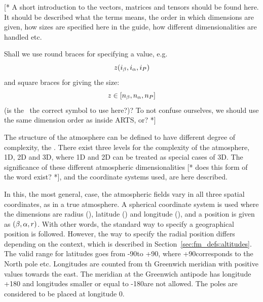 \label{sec:fm_defs:math}

[* A short introduction to the vectors, matrices and tensors should be
found here. It should be described what the terms means, the order in
which dimensions are given, how sizes are specified here in the guide,
how different dimensionalities are handled etc. 

Shall we use round braces for specifying a value, e.g.
\begin{equation}
  z(i_{\beta},i_{\alpha},i_{P})
\end{equation}
and square braces for giving the size:
\begin{equation}
  z \in [n_{\beta},n_{\alpha},n_{P}]
\end{equation}
(is the \SzeSmb\ the correct symbol to use here?)? To not confuse
ourselves, we should use the same dimension order as inside ARTS, or?  *]



\label{sec:fm_defs:atmosphere}


\label{sec:fm_defs:atmdim}

The structure of the atmosphere can be defined to have different
degree of complexity, the . There
exist three levels for the complexity of the atmosphere, 1D, 2D and
3D, where 1D and 2D can be treated as special cases of 3D. The
significance of these different atmospheric dimensionalities [* does
this form of the word exist? *], and the coordinate systems used, are
here described.

 In this, the most general, case, the
atmospheric fields vary in all three spatial coordinates, as in a true
atmosphere. A spherical coordinate system is used where the dimensions
are radius (\Rds), latitude (\Lat) and longitude (\Lon), and a
position is given as $(\beta,\alpha,r)$. With other words, the
standard way to specify a geographical position is followed. However,
the way to specify the radial position differs depending on the
context, which is described in Section~\ref{sec:fm_defs:altitudes}.
The valid range for latitudes goes from -90\degree to +90\degree,
where +90\degree corresponds to the North pole etc. Longitudes are
counted from th Greenwich meridian with positive values towards the
east. The meridian at the Greenwich antipode has longitude +180\degree
and longitudes smaller or equal to -180\degree are not allowed. The
poles are considered to be placed at longitude 0\degree.


